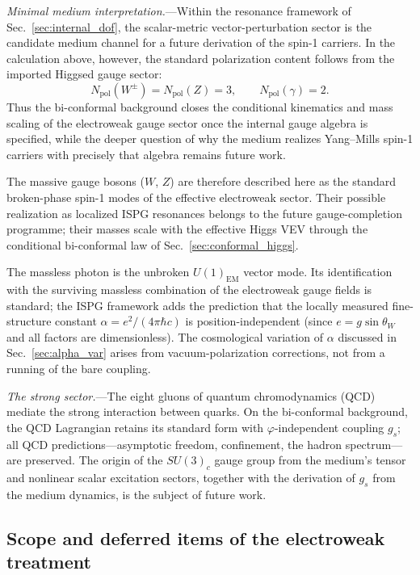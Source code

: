 \documentclass[aps,prd,onecolumn,superscriptaddress,nofootinbib,showpacs,12pt,notitlepage]{revtex4-2}
\begin{document}
\textit{Minimal medium interpretation.}---Within the
resonance framework of Sec.~\ref{sec:internal_dof}, the
scalar-metric vector-perturbation sector is the candidate
medium channel for a future derivation of the spin-1 carriers.
In the calculation above, however, the standard polarization
content follows from the imported Higgsed gauge sector:
\begin{equation}\label{eq:gauge_polarization_count}
  N_{\mathrm{pol}}(W^\pm)=N_{\mathrm{pol}}(Z)=3,\qquad
  N_{\mathrm{pol}}(\gamma)=2.
\end{equation}
Thus the bi-conformal background closes the conditional
kinematics and mass scaling of the electroweak gauge sector
once the internal gauge algebra is specified, while the deeper
question of why the medium realizes Yang--Mills spin-1
carriers with precisely that algebra remains future work.

The massive gauge bosons ($W$, $Z$) are therefore described
here as the standard broken-phase spin-1 modes of the
effective electroweak sector.  Their possible realization as
localized ISPG resonances belongs to the future
gauge-completion programme; their masses scale with the
effective Higgs VEV through the conditional bi-conformal
law of Sec.~\ref{sec:conformal_higgs}.

The massless photon is the unbroken $U(1)_{\mathrm{EM}}$
vector mode.  Its identification with the surviving
massless combination of the electroweak gauge fields is
standard; the ISPG framework adds the prediction that
the locally measured fine-structure constant
$\alpha = e^2/(4\pi\hbar c)$ is position-independent
(since $e = g\sin\theta_W$ and all factors are
dimensionless).  The cosmological variation of $\alpha$
discussed in Sec.~\ref{sec:alpha_var} arises from
vacuum-polarization corrections, not from a running of
the bare coupling.

\textit{The strong sector.}---The eight gluons of quantum
chromodynamics (QCD) mediate the strong interaction between
quarks.  On the bi-conformal background, the QCD Lagrangian
retains its standard form with $\varphi$-independent coupling
$g_s$; all QCD predictions---asymptotic freedom, confinement,
the hadron spectrum---are preserved.  The origin of the
$SU(3)_c$ gauge group from the medium's tensor and nonlinear
scalar excitation sectors, together with the derivation of
$g_s$ from the medium dynamics, is the subject of future work.

\subsection{Scope and deferred items of the electroweak treatment}
\label{sec:ew_scope}
\end{document}
